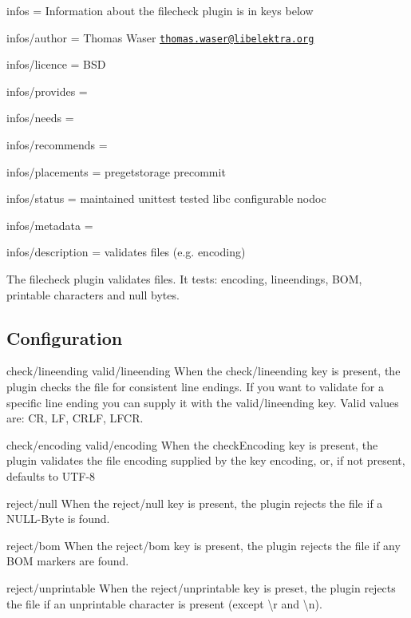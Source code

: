 
\begin{DoxyItemize}
\item infos = Information about the filecheck plugin is in keys below
\item infos/author = Thomas Waser \href{mailto:thomas.waser@libelektra.org}{\tt thomas.\+waser@libelektra.\+org}
\item infos/licence = B\+SD
\item infos/provides =
\item infos/needs =
\item infos/recommends =
\item infos/placements = pregetstorage precommit
\item infos/status = maintained unittest tested libc configurable nodoc
\item infos/metadata =
\item infos/description = validates files (e.\+g. encoding)
\end{DoxyItemize}

The filecheck plugin validates files. It tests\+: encoding, lineendings, B\+OM, printable characters and null bytes.

\subsection*{Configuration}

{\ttfamily check/lineending} {\ttfamily valid/lineending} When the {\ttfamily check/lineending} key is present, the plugin checks the file for consistent line endings. If you want to validate for a specific line ending you can supply it with the {\ttfamily valid/lineending} key. Valid values are\+: {\ttfamily CR}, {\ttfamily LF}, {\ttfamily C\+R\+LF}, {\ttfamily L\+F\+CR}.

{\ttfamily check/encoding} {\ttfamily valid/encoding} When the {\ttfamily check\+Encoding} key is present, the plugin validates the file encoding supplied by the key {\ttfamily encoding}, or, if not present, defaults to {\ttfamily U\+T\+F-\/8}

{\ttfamily reject/null} When the {\ttfamily reject/null} key is present, the plugin rejects the file if a N\+U\+L\+L-\/\+Byte is found.

{\ttfamily reject/bom} When the {\ttfamily reject/bom} key is present, the plugin rejects the file if any B\+OM markers are found.

{\ttfamily reject/unprintable} When the {\ttfamily reject/unprintable} key is preset, the plugin rejects the file if an unprintable character is present (except {\ttfamily \textbackslash{}r} and {\ttfamily \textbackslash{}n}). 